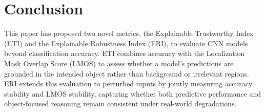 \documentclass[a4paper,fleqn]{cas-dc}
\begin{document}



    
    


\section{Conclusion}     
\label{sec:conclusion}

This paper has proposed two novel metrics, the Explainable Trustworthy Index (ETI) and the Explainable Robustness Index (ERI), to evaluate CNN models beyond classification accuracy. ETI combines accuracy with the Localization Mask Overlap Score (LMOS) to assess whether a model's predictions are grounded in the intended object rather than background or irrelevant regions. ERI extends this evaluation to perturbed inputs by jointly measuring accuracy stability and LMOS stability, capturing whether both predictive performance and object-focused reasoning remain consistent under real-world degradations.
\end{document}
